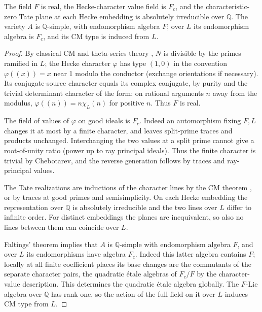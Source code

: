 \begin{lemma}[CM realizations]\label{cm:realization}
The field \(F\) is real, the Hecke-character value field is \(F_c\),
and the characteristic-zero Tate plane at each Hecke embedding is
absolutely irreducible over \(\mathbb Q\).
The variety \(A\) is \(\mathbb Q\)-simple, with endomorphism algebra
\(F\); over \(L\) its endomorphism algebra is \(F_c\), and its CM type
is induced from \(L\).
\end{lemma}

\begin{proof}
By classical CM and theta-series theory
\cite[Theorems~1.1 and~1.4]{Schuett09}, \(N\) is divisible by the primes
ramified in \(L\);
the Hecke character \(\varphi\) has type \((1,0)\) in the convention \(\varphi((x))=x\) near 1
modulo the conductor (exchange orientations if necessary). Its conjugate-source character
equals its complex conjugate, by purity and the trivial determinant character of the form: on
rational arguments \(n\) away from the modulus, \(\varphi((n))=n\chi_L(n)\) for positive
\(n\). Thus \(F\) is real.

The field of values of \(\varphi\) on good ideals is \(F_c\). Indeed an automorphism fixing
\(F,L\) changes it at most by a finite character, and leaves split-prime traces and products
unchanged. Interchanging the two values at a split prime cannot give a root-of-unity ratio
(power up to ray principal ideals). Thus the finite character is trivial by Chebotarev, and
the reverse generation follows by traces and ray-principal values.

The Tate realizations are inductions of the character lines by the CM theorem
\cite[Sections~3--4]{Ribet77}, or by traces at good primes and semisimplicity.
On each Hecke embedding the representation over \(\mathbb Q\)
is absolutely irreducible and the two lines over \(L\) differ to infinite order. For distinct
embeddings the planes are inequivalent, so also no lines between them can coincide over \(L\).

Faltings' theorem \cite{Faltings83} implies that \(A\) is \(\mathbb Q\)-simple with
endomorphism algebra \(F\), and over \(L\) its endomorphisms have algebra \(F_c\). Indeed this
latter algebra contains \(F\); locally at all finite coefficient places its base changes are
the commutants of the separate character pairs, the quadratic étale algebras of \(F_c/F\) by
the character-value description. This determines the quadratic étale algebra globally. The
\(F\)-Lie algebra over \(\mathbb Q\) has rank one, so the action of the full field on it over
\(L\) induces CM type from \(L\).
\end{proof}

